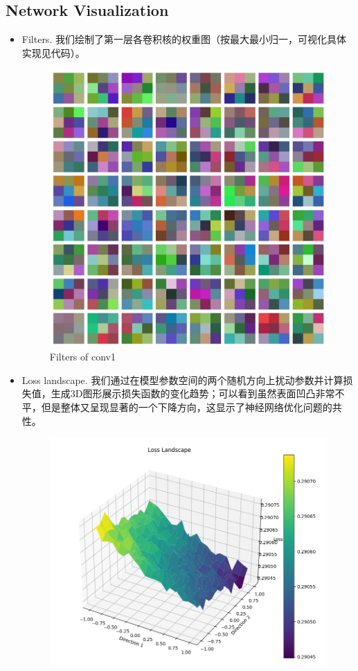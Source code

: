 \documentclass[10pt]{ctexart}
\begin{document}
\subsection{Network Visualization}
\begin{itemize}
	\item Filters. 我们绘制了第一层各卷积核的权重图（按最大最小归一，可视化具体实现见代码）。
	\begin{figure}[H]
		\centering
		\includegraphics[width=0.6\linewidth]{filters_conv1.png}
		\caption{Filters of conv1}
	\end{figure}
	
	\item Loss landscape. 我们通过在模型参数空间的两个随机方向上扰动参数并计算损失值，生成3D图形展示损失函数的变化趋势；可以看到虽然表面凹凸非常不平，但是整体又呈现显著的一个下降方向，这显示了神经网络优化问题的共性。
	
	\begin{figure}[hb]
		\centering
		\includegraphics[width=0.7\linewidth]{loss_landscape.png}
		\caption{}
	\end{figure}
	

\end{itemize}
\end{document}
